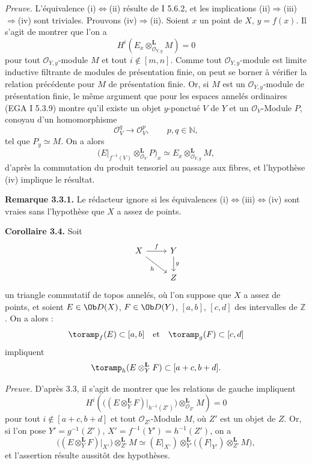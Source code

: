 \documentclass[11pt]{article}
\begin{document}
\emph{Preuve.} L'équivalence (i)\(\Longleftrightarrow\)(ii) résulte de I 5.6.2, et les implications (ii)\(\Rightarrow\)(iii)\(\Rightarrow\)(iv) sont triviales. Prouvons (iv)\(\Rightarrow\)(ii). Soient \(x\) un point de \(X\), \(y=f(x)\). Il s'agit de montrer que l'on a
\[
  H^i(E_x\otimes_{\mathcal O_{Y,y}}^{\mathbf L}M)=0
\]
pour tout \(\mathcal O_{Y,y}\)-module \(M\) et tout \(i\notin[m,n]\). Comme tout \(\mathcal O_{Y,y}\)-module est limite inductive filtrante de modules de présentation finie, on peut se borner à vérifier la relation précédente pour \(M\) de présentation finie. Or, si \(M\) est un \(\mathcal O_{Y,y}\)-module de présentation finie, le même argument que pour les espaces annelés ordinaires (EGA I 5.3.9) montre qu'il existe un objet \(y\)-ponctué \(V\) de \(Y\) et un \(\mathcal O_V\)-Module \(P\), conoyau d'un homomorphisme
\[
  \mathcal O_V^q\longrightarrow\mathcal O_V^p,\qquad p,q\in\mathbb N,
\]
tel que \(P_y\simeq M\). On a alors
\[
  \bigl(E\vert_{f^{-1}(V)}\otimes_{\mathcal O_V}^{\mathbf L}P\bigr)_x
  \simeq
  E_x\otimes_{\mathcal O_{Y,y}}^{\mathbf L}M,
\]
d'après la commutation du produit tensoriel au passage aux fibres, et l'hypothèse (iv) implique le résultat.

\textbf{Remarque 3.3.1.} Le rédacteur ignore si les équivalences (i)\(\Longleftrightarrow\)(iii)\(\Longleftrightarrow\)(iv) sont vraies sans l'hypothèse que \(X\) a assez de points.

\textbf{Corollaire 3.4.} Soit
\[
\begin{tikzcd}
X \arrow[r,"f"] \arrow[dr,"h"'] & Y \arrow[d,"g"]\\
& Z
\end{tikzcd}
\]
un triangle commutatif de topos annelés, où l'on suppose que \(X\) a assez de points, et soient \(E\in\Ob D(X)\), \(F\in\Ob D(Y)\), \([a,b]\), \([c,d]\) des intervalles de \(\mathbb Z\). On a alors :
\[
  \toramp_f(E)\subset[a,b]\quad\text{et}\quad\toramp_g(F)\subset[c,d]
\]
impliquent
\[
  \toramp_h(E\otimes_Y^{\mathbf L}F)\subset[a+c,b+d].
\]

\emph{Preuve.} D'après 3.3, il s'agit de montrer que les relations de gauche impliquent
\[
  H^i\left(\bigl((E\otimes_Y^{\mathbf L}F)\vert_{h^{-1}(Z')}\bigr)
  \otimes_{\mathcal O_{Z'}}^{\mathbf L}M\right)=0
\]
pour tout \(i\notin[a+c,b+d]\) et tout \(\mathcal O_{Z'}\)-Module \(M\), où \(Z'\) est un objet de \(Z\). Or, si l'on pose \(Y'=g^{-1}(Z')\), \(X'=f^{-1}(Y')=h^{-1}(Z')\), on a
\[
  \bigl((E\otimes_Y^{\mathbf L}F)\vert_{X'}\bigr)
  \otimes_{Z'}^{\mathbf L}M
  \simeq
  (E\vert_{X'})\otimes_{Y'}^{\mathbf L}
  \bigl((F\vert_{Y'})\otimes_{Z'}^{\mathbf L}M\bigr),
\]
et l'assertion résulte aussitôt des hypothèses.
\end{document}
